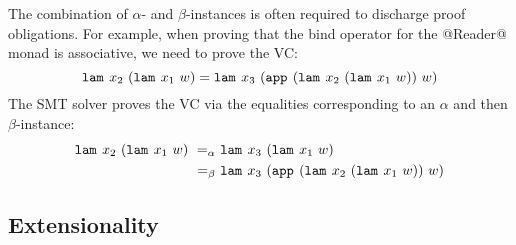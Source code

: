 %
The combination of $\alpha$- and $\beta$-instances
is often required to discharge proof obligations.
%
For example, when proving that the bind operator
for the @Reader@ monad is associative, we need
to prove the VC:
%
$$\texttt{lam}^{}_{}\ {x_2}\ {(\texttt{lam}^{}_{}\ {x_1}\ {w})} =
  \texttt{lam}^{}_{}\ {x_3}\ {(\texttt{app}^{}_{}\ {(\texttt{lam}^{}_{}\ {x_2}\ {(\texttt{lam}^{}_{}\ {x_1}\ {w})})}\ {w})}$$
%
The SMT solver proves the VC via the equalities
corresponding to an $\alpha$ and then $\beta$-instance:
%
\begin{align*}
\texttt{lam}^{}_{}\ {x_2}\ {(\texttt{lam}^{}_{}\ {x_1}\ {w})}
  \ =_{\alpha}\ & \texttt{lam}^{}_{}\ {x_3}\ {(\texttt{lam}^{}_{}\ {x_1}\ {w})} \\
  \ =_{\beta}\ & \texttt{lam}^{}_{}\ {x_3}\ {(\texttt{app}^{}_{}\ {(\texttt{lam}^{}_{}\ {x_2}\ {(\texttt{lam}^{}_{}\ {x_1}\ {w})})}\ {w})}
\end{align*}


\subsection{Extensionality} \label{subsec:extensionality}

